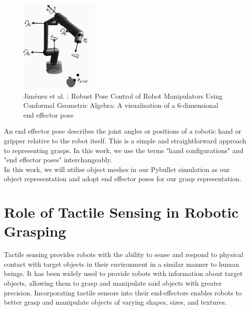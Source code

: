 \documentclass[11pt, a4paper]{report}
\begin{document}
\begin{figure}[H]
    \centering
    \includegraphics[width=0.35\textwidth]{docs/Project Report/Media/2_1_2_ee_pose_eg.png}
    \caption{Jiménez et al. \cite{jimenez2014}: Robust Pose Control of Robot Manipulators Using Conformal Geometric Algebra: A visualisation of a 6-dimensional end effector pose}
    \label{fig:2.5}
\end{figure}

An end effector pose describes the joint angles or positions of a robotic hand or gripper relative to the robot itself. This is a simple and straightforward approach to representing grasps. In this work, we use the terms "hand configurations" and "end effector poses" interchangeably.\\

In this work, we will utilise object meshes in our Pybullet simulation as our object representation and adopt end effector poses for our grasp representation.


\section{Role of Tactile Sensing in Robotic Grasping}
\label{sec:2.2}
Tactile sensing provides robots with the ability to sense and respond to physical contact with target objects in their environment in a similar manner to human beings. It has been widely used to provide robots with information about target objects, allowing them to grasp and manipulate said objects with greater precision. Incorporating tactile sensors into their end-effectors enables robots to better grasp and manipulate objects of varying shapes, sizes, and textures.\\
\end{document}
